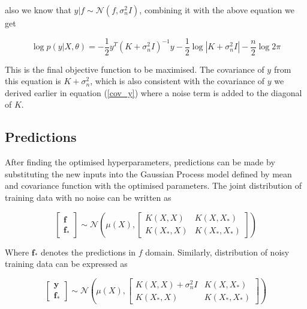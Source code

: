 \documentclass[11pt]{report}
\numberwithin{equation}{chapter}
\begin{document}
\begin{spacing}{2}
also we know that $y|f\sim \mathcal{N}\left(f,\sigma_n^2 I\right)$, combining it with the above equation we get

\begin{equation}
\operatorname{log}p(y|X,\theta) = -\frac{1}{2}y^T(K+\sigma_n^2 I)^{-1}y - \frac{1}{2}\operatorname{log}\left|K+\sigma_n^2 I\right|- \frac{n}{2}\operatorname{log}2\pi
\end{equation}

This is the final objective function to be maximised. The covariance of $y$ from this equation is $K+\sigma_n^2$, which is also consistent with the covariance of $y$ we derived earlier in equation (\ref{cov_y}) where a noise term is added to the diagonal of $K$.


\subsection{Predictions}
After finding the optimised hyperparameters, predictions can be made by substituting the new inputs into the Gaussian Process model defined by mean and covariance function with the optimised parameters. The joint distribution of training data with no noise can be written as 

\begin{equation}
\left[\begin{array}{c} 
\mathbf{f} \\
\mathbf{f}_\ast \end{array}
 \right] \sim \mathcal{N} 
 \left(\mu(X), \left[\begin{array}{cc}
 K(X, X) & K(X, X_\ast)\\
 K(X_\ast, X) & K(X_\ast, X_\ast)
 \end{array}\right]\right)
\end{equation} 

Where $\mathbf{f}_\ast$ denotes the predictions in $f$ domain. Similarly, distribution of noisy training data can be expressed as

\begin{equation}
\left[\begin{array}{c} 
\mathbf{y}\\
\mathbf{f}_\ast \end{array}
 \right] \sim \mathcal{N} 
 \left(\mu(X), \left[\begin{array}{cc}
 K(X, X) + \sigma_n^2I & K(X, X_\ast)\\
 K(X_\ast, X) & K(X_\ast, X_\ast)
 \end{array}\right]\right)
\end{equation}


\end{spacing}
\end{document}
